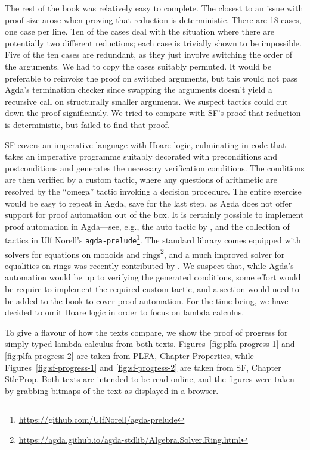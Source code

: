 \documentclass[preprint,authoryear]{elsarticle}
\begin{document}
The rest of the book was relatively easy to complete.  The closest to
an issue with proof size arose when proving that reduction is
deterministic.  There are 18 cases, one case per line.  Ten of the
cases deal with the situation where there are potentially two
different reductions; each case is trivially shown to be
impossible.  Five of the ten cases are redundant, as they just involve
switching the order of the arguments.  We had to copy the cases
suitably permuted. It would be preferable to reinvoke the proof on
switched arguments, but this would not pass Agda's termination checker
since swapping the arguments doesn't yield a recursive call on
structurally smaller arguments.  We suspect tactics could cut down the
proof significantly. We tried to compare with SF's proof that reduction
is deterministic, but failed to find that proof.

SF covers an imperative language with Hoare logic, culminating in code that
takes an imperative programme suitably decorated with preconditions and
postconditions and generates the necessary verification conditions. The
conditions are then verified by a custom tactic, where any questions of
arithmetic are resolved by the ``omega'' tactic invoking a decision procedure.
The entire exercise would be easy to repeat in Agda, save for the last step, as
Agda does not offer support for proof automation out of the box. It is 
certainly possible to implement proof automation in Agda---see, e.g., the auto
tactic by \citet{Kokke-2015}, and the collection of tactics in Ulf Norell's
\texttt{agda-prelude}\footnote{\url{https://github.com/UlfNorell/agda-prelude}}.
The standard library comes equipped with solvers for equations on monoids and
rings\footnote{\url{https://agda.github.io/agda-stdlib/Algebra.Solver.Ring.html}},
and a much improved solver for equalities on rings was recently contributed by
\citet{Kidney-2019}.
We suspect that, while Agda's automation would be up to verifying the generated
conditions, some effort would be require to implement the required custom
tactic, and a section would need to be added to the book to cover proof
automation. For the time being, we have decided to omit Hoare logic in order to
focus on lambda calculus.

To give a flavour of how the texts compare, we show the
proof of progress for simply-typed lambda calculus from both texts.
Figures~\ref{fig:plfa-progress-1} and \ref{fig:plfa-progress-2}
are taken from PLFA, Chapter Properties,
while Figures~\ref{fig:sf-progress-1} and \ref{fig:sf-progress-2}
are taken from SF, Chapter StlcProp.
Both texts are intended to be read online,
and the figures were taken by grabbing bitmaps of the text as
displayed in a browser.
\end{document}
